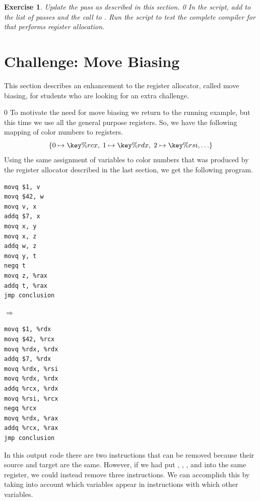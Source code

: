 \documentclass[7x10]{TimesAPriori_MIT}%
\def\racketEd{0}
\providecommand{\BookEdition}{1}
\let\edition\BookEdition
\newcommand{\racket}[1]{{\if\edition\racketEd{#1}\fi}}
\newtheorem{exercise}[theorem]{Exercise}
\numberwithin{theorem}{chapter}
\numberwithin{definition}{chapter}
\numberwithin{equation}{chapter}
\begin{document}
\begin{exercise}\normalfont\normalsize
Update the  pass as described in this section.
%
\racket{
In the  script, add \code{prelude\_and\_conclusion} to the
list of passes and the call to \code{compiler-tests}.}
%
Run the script to test the complete compiler for \LangVar{} that
performs register allocation.
\end{exercise}

\section{Challenge: Move Biasing}
\label{sec:move-biasing}

This section describes an enhancement to the register allocator,
called move biasing, for students who are looking for an extra
challenge.

{\if\edition\racketEd      
To motivate the need for move biasing we return to the running example,
but this time we use all the general purpose registers. So, we have
the following mapping of color numbers to registers.
\[
  \{ 0 \mapsto \key{\%rcx}, \; 1 \mapsto \key{\%rdx}, \; 2 \mapsto \key{\%rsi}, \ldots \}
\]
Using the same assignment of variables to color numbers that was
produced by the register allocator described in the last section, we
get the following program.
\begin{center}
\begin{minipage}{0.35\textwidth}
\begin{lstlisting}
movq $1, v
movq $42, w
movq v, x
addq $7, x
movq x, y
movq x, z
addq w, z
movq y, t
negq t
movq z, %rax
addq t, %rax
jmp conclusion
\end{lstlisting}
\end{minipage}
$\Rightarrow\qquad$
\begin{minipage}{0.45\textwidth}
\begin{lstlisting}
movq $1, %rdx
movq $42, %rcx
movq %rdx, %rdx
addq $7, %rdx
movq %rdx, %rsi
movq %rdx, %rdx
addq %rcx, %rdx
movq %rsi, %rcx
negq %rcx
movq %rdx, %rax
addq %rcx, %rax
jmp conclusion
\end{lstlisting}
\end{minipage}
\end{center}
In this output code there are two  instructions that
can be removed because their source and target are the same.  However,
if we had put , , , and  into the same
register, we could instead remove three  instructions.  We
can accomplish this by taking into account which variables appear in
 instructions with which other variables.
\fi}
\end{document}
